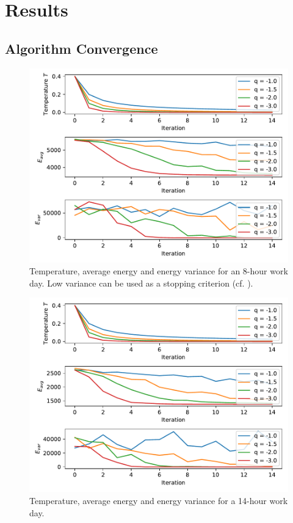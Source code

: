 \section{Results}
\label{sec:results}
\subsection{Algorithm Convergence}
\label{sec:convergence}
\begin{figure}[H]
  \centering
  \includegraphics[width=0.8\linewidth]{results/convergence-8h-day.pdf}
  \caption{Temperature, average energy and energy variance for an 8-hour work day. Low variance can be used as a stopping criterion (cf. ).}
\end{figure}
\begin{figure}[H]
  \centering
  \includegraphics[width=0.8\linewidth]{results/convergence-14h-day.pdf}
  \caption{Temperature, average energy and energy variance for a 14-hour work day.}
\end{figure}

